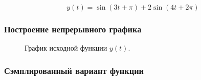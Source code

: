 \documentclass[a5paper, 10pt]{article}
\theoremstyle{definition}
\theoremstyle{plain}
\theoremstyle{remark}
\begin{document}
\begin{equation}
y(t) =  \sin \left( 3 t + \pi \right) + 2 \sin \left(  4 t + 2\pi \right)
\end{equation}

\subsubsection{Построение непрерывного графика}
\begin{figure}[h!]
\caption{График исходной функции $y(t)$.}
\end{figure}

\subsubsection{Сэмплированный вариант функции}
\end{document}
